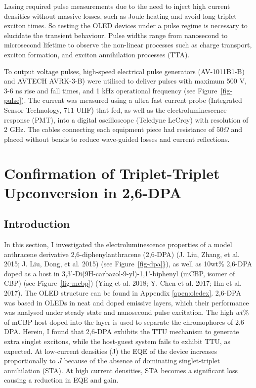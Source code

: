 \documentclass[
  letterpaper,
  DIV=11,
  numbers=noendperiod,
  oneside]{scrreprt}
\begin{document}
Lasing required pulse measurements due to the need to inject high
current densities without massive losses, such as Joule heating and
avoid long triplet exciton times. So testing the OLED devices under a
pulse regime is necessary to elucidate the transient behaviour. Pulse
widths range from nanosecond to microsecond lifetime to observe the
non-linear processes such as charge transport, exciton formation, and
exciton annihilation processes (TTA).

To output voltage pulses, high-speed electrical pulse generators
(AV-1011B1-B) and AVTECH AVRK-3-B) were utilised to deliver pulses with
maximum 500 V, 3-6 ns rise and fall times, and 1 kHz operational
frequency (see Figure~\ref{fig-pulse}). The current was measured using a
ultra fast current probe (Integrated Sensor Technology, 711 UHF) that
fed, as well as the electroluminescence response (PMT), into a digital
oscilloscope (Teledyne LeCroy) with resolution of 2 GHz. The cables
connecting each equipment piece had resistance of \(50 \Omega\) and
placed without bends to reduce wave-guided losses and current
reflections.


\hypertarget{confirmation-of-triplet-triplet-upconversion-in-26-dpa}{%
\chapter[ Confirmation of Triplet-Triplet Upconversion in
2,6-DPA]{\texorpdfstring{\protect\hypertarget{sec:level3}{}{}
Confirmation of Triplet-Triplet Upconversion in
2,6-DPA}{ Confirmation of Triplet-Triplet Upconversion in 2,6-DPA}}\label{confirmation-of-triplet-triplet-upconversion-in-26-dpa}}

\hypertarget{introduction}{%
\section{Introduction}\label{introduction}}

In this section, I investigated the electroluminescence properties of a
model anthracene derivative 2,6-diphenylanthracene (2,6-DPA) (J. Liu,
Zhang, et al. 2015; J. Liu, Dong, et al. 2015) (see
Figure~\ref{fig-dpa}\}), as well as 10wt\% 2,6-DPA doped as a host in
3,3'-Di(9H-carbazol-9-yl)-1,1'-biphenyl (mCBP, isomer of CBP) (see
Figure~\ref{fig-mcbp}) (Ying et al. 2018; Y. Chen et al. 2017; Ihn et
al. 2017). The OLED structure can be found in Appendix
\protect\hyperlink{apen:oledex}{{[}apen:oledex{]}}. 2,6-DPA was based in
OLEDs in neat and doped emissive layers, which their performance was
analysed under steady state and nanosecond pulse excitation. The high
\(wt\%\) of mCBP host doped into the layer is used to separate the
chromophores of 2,6-DPA. Herein, I found that 2,6-DPA exhibits the TTU
mechanism to generate extra singlet excitons, while the host-guest
system fails to exhibit TTU, as expected. At low-current densities (J)
the EQE of the device increases proportionally to \(J\) because of the
absence of dominating singlet-triplet annihilation (STA). At high
current densities, STA becomes a significant loss causing a reduction in
EQE and gain.
\end{document}
